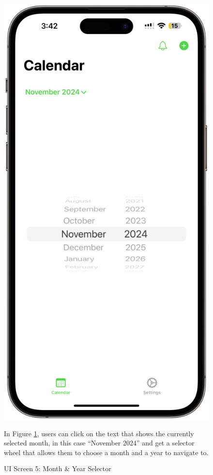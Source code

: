 \begin{figure}[!h]
    \begin{minipage}{0.3\textwidth}
        \centering
        \includegraphics[width=\textwidth]{images/screen5.png}
        \caption{UI Screen 5: Month \& Year Selector}
        \label{fig:ui-screen-5}
    \end{minipage}
    \hfill
    \begin{minipage}{0.65\textwidth}
        In Figure \ref{fig:ui-screen-5}, users can click on the text that shows the currently selected month, in this case ``November 2024'' and get a selector wheel that allows them to choose a month and a year to navigate to.
    \end{minipage}
\end{figure}

